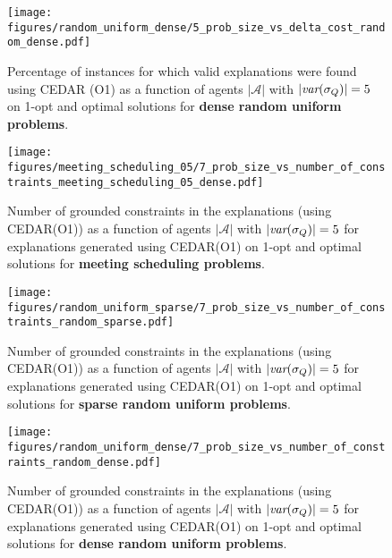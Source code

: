 \documentclass[twoside,11pt]{article}
\begin{document}
\begin{figure}[h]
\centering
\small
\texttt{[image: figures/random\_uniform\_dense/5\_prob\_size\_vs\_delta\_cost\_random\_dense.pdf]} \\ 
\vspace{-0.5em} 
\caption{Percentage of instances for which valid explanations were found using CEDAR (O1) as a function of agents $|\mathcal{A}|$ with $|{\textit{var}(\sigma_Q)}| = 5$  on 1-opt and optimal solutions for \textbf{dense random uniform problems}.}
\label{fig:5_results_percent_A_dense}
\end{figure}





\begin{figure}[h]
\centering
\small
\texttt{[image: figures/meeting\_scheduling\_05/7\_prob\_size\_vs\_number\_of\_constraints\_meeting\_scheduling\_05\_dense.pdf]} \\ 
\vspace{-0.5em} 
\caption{Number of grounded constraints in the explanations (using CEDAR(O1)) as a function of agents $|\mathcal{A}|$ with $|{\textit{var}(\sigma_Q)}| = 5$ for explanations generated using CEDAR(O1) on 1-opt and optimal solutions for \textbf{meeting scheduling problems}.}
\label{fig:7_results_num_constraints_A_meeting}
\end{figure}

\begin{figure}[h]
\centering
\small
\texttt{[image: figures/random\_uniform\_sparse/7\_prob\_size\_vs\_number\_of\_constraints\_random\_sparse.pdf]} \\ 
\vspace{-0.5em} 
\caption{Number of grounded constraints in the explanations (using CEDAR(O1)) as a function of agents $|\mathcal{A}|$ with $|{\textit{var}(\sigma_Q)}| = 5$ for explanations generated using CEDAR(O1) on 1-opt and optimal solutions for \textbf{sparse random uniform problems}.}
\label{fig:7_results_num_constraints_A_sparse}
\end{figure}

\begin{figure}[h]
\centering
\small
\texttt{[image: figures/random\_uniform\_dense/7\_prob\_size\_vs\_number\_of\_constraints\_random\_dense.pdf]} \\ 
\vspace{-0.5em} 
\caption{Number of grounded constraints in the explanations (using CEDAR(O1)) as a function of agents $|\mathcal{A}|$ with $|{\textit{var}(\sigma_Q)}| = 5$ for explanations generated using CEDAR(O1) on 1-opt and optimal solutions for \textbf{dense random uniform problems}.}
\label{fig:7_results_num_constraints_A_dense}
\end{figure}
\end{document}
